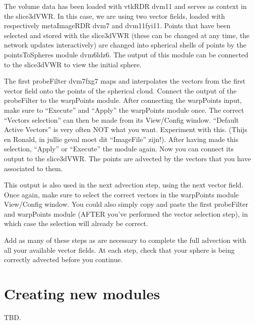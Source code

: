 The volume data has been loaded with vtkRDR dvm11 and serves as
context in the slice3dVWR.  In this case, we are using two vector
fields, loaded with respectively metaImageRDR dvm7 and dvm11fyi11.
Points that have been selected and stored with the slice3dVWR (these
can be changed at any time, the network updates interactively) are
changed into spherical shells of points by the pointsToSpheres module
dvm6ldz6.  The output of this module can be connected to the
slice3dVWR to view the initial sphere.

The first probeFilter dvm7fxg7 maps and interpolates the vectors from
the first vector field onto the points of the spherical cloud.
Connect the output of the probeFilter to the warpPoints module.  After
connecting the warpPoints input, make sure to ``Execute'' and
``Apply'' the warpPoints module once.  The correct ``Vectors
selection'' can then be made from its View/Config window.  ``Default
Active Vectors'' is very often NOT what you want.  Experiment with
this.  (Thijs en Ronald, in jullie geval moet dit ``ImageFile''
zijn!).  After having made this selection, ``Apply'' or ``Execute''
the module again.  Now you can connect its output to the slice3dVWR.
The points are advected by the vectors that you have associated to
them.

This output is also used in the next advection step, using the next
vector field.  Once again, make sure to select the correct vectors in
the warpPoints module View/Config window.  You could also simply copy
and paste the first probeFilter and warpPoints module (AFTER you've
performed the vector selection step), in which case the selection will
already be correct.

Add as many of these steps as are necessary to complete the full
advection with all your available vector fields.  At each step, check
that your sphere is being correctly advected before you continue.

\chapter{Creating new modules}
TBD.

%

%
\setfooter{\thepage}{}{}{}{}{\thepage}%
\printindex%


